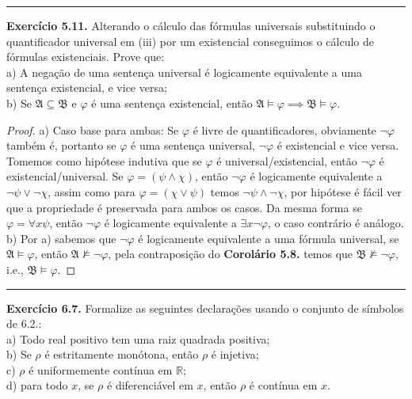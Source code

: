 \documentclass[11pt]{article}
\theoremstyle{definition}
\newcommand{\mf}[1]{\mathfrak{#1}}
\newcommand{\mbb}[1]{\mathbb{#1}}
\begin{document}
\hrule

\textbf{Exercício 5.11.} Alterando o cálculo das fórmulas universais substituindo o quantificador universal em (iii) por um existencial conseguimos o cálculo de fórmulas existenciais. Prove que: \\
a) A negação de uma sentença universal é logicamente equivalente a uma sentença existencial, e vice versa;\\
b) Se $\mf{A}\subseteq\mf{B}$ e $\varphi$ é uma sentença existencial, então $\mf{A}\vDash\varphi\implies\mf{B}\vDash\varphi$.

\begin{proof}
    a) Caso base para ambas: Se $\varphi$ é livre de quantificadores, obviamente $\neg\varphi$ também é, portanto se $\varphi$ é uma sentença universal, $\neg\varphi$ é existencial e vice versa. Tomemos como hipótese indutiva que se $\varphi$ é universal/existencial, então $\neg\varphi$ é existencial/universal. Se $\varphi=(\psi\wedge\chi)$, então $\neg\varphi$ é logicamente equivalente a $\neg\psi\vee\neg\chi$, assim como para $\varphi=(\chi\vee\psi)$ temos $\neg\psi\wedge\neg\chi$, por hipótese é fácil ver que a propriedade é preservada para ambos os casos. Da mesma forma se $\varphi=\forall x\psi$, então $\neg\varphi$ é logicamente equivalente a $\exists x\neg\varphi$, o caso contrário é análogo.\\
    b) Por a) sabemos que $\neg\varphi$ é logicamente equivalente a uma fórmula universal, se $\mf{A}\vDash\varphi$, então $\mf{A}\nvDash\neg\varphi$, pela contraposição do \textbf{Corolário 5.8.} temos que $\mf{B}\nvDash\neg\varphi$, i.e., $\mf{B}\vDash\varphi$.
\end{proof}

\hrule

\textbf{Exercício 6.7.} Formalize as seguintes declarações usando o conjunto de símbolos de 6.2.:\\
a) Todo real positivo tem uma raiz quadrada positiva;\\
b) Se $\rho$ é estritamente monótona, então $\rho$ é injetiva;\\
c) $\rho$ é uniformemente contínua em $\mbb{R}$;\\
d) para todo $x$, se $\rho$ é diferenciável em $x$, então $\rho$ é contínua em $x$.
\end{document}
